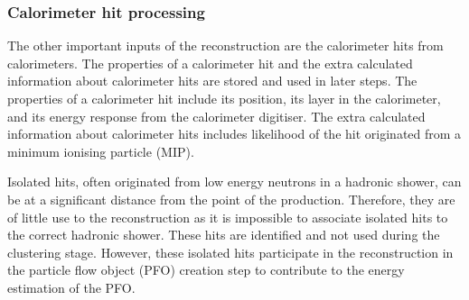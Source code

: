 

\subsubsection{Calorimeter hit processing}

The other important inputs of  the \pandora reconstruction are the calorimeter hits from calorimeters. The properties of a calorimeter hit and the extra calculated information about calorimeter hits are stored and used in later steps.  The properties of a calorimeter hit include its position, its layer in the calorimeter, and its energy response from the calorimeter digitiser. The extra calculated information about calorimeter hits  includes  likelihood of the hit originated from a minimum ionising particle (MIP).


Isolated hits, often originated from low energy neutrons in a hadronic shower, can be at a significant distance from the point of the production. Therefore, they are of little use to the \pandora reconstruction as it is impossible to associate isolated hits to the correct hadronic shower. These hits are identified and not used during the clustering stage. However, these isolated hits participate in the reconstruction in the particle flow object (PFO) creation step to contribute to the energy estimation of the PFO.


